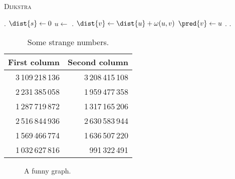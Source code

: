 \begin{algorithm}[bt]
\caption{\textsc{Dijkstra}}\label{alg:dijkstra}

\DontPrintSemicolon %



\BlankLine
{}
\Q.\; $\dist{s} \leftarrow 0$ \;
\BlankLine
{}
{
  $u \leftarrow$ \Q.\queueDeleteMin{} \;
  {
    {
      $\dist{v} \leftarrow \dist{u} + \omega(u,v)$ \;
      $\pred{v} \leftarrow u$ \;
      {
        \Q.
      }
      \Else
      {
        \Q.
      }
    }
  }
}
\end{algorithm}

\begin{table} [bt]
\centering
\caption{Some strange numbers.}
\begin{tabular}{rr}
\toprule
First column & Second column \\
\midrule
3\,109\,218\,136 & 3\,208\,415\,108 \\
2\,231\,385\,058 & 1\,959\,477\,358 \\
1\,287\,719\,872 & 1\,317\,165\,206 \\
2\,516\,844\,936 & 2\,630\,583\,944 \\
1\,569\,466\,774 & 1\,636\,507\,220 \\
1\,032\,627\,816 &    991\,322\,491 \\
\bottomrule
\end{tabular}
\label{tbl:randomnumbers}
\end{table}

\begin{figure} [bt]
  \centering
  \caption{A funny graph.}
  \label{fig:somegraph}
\end{figure}
